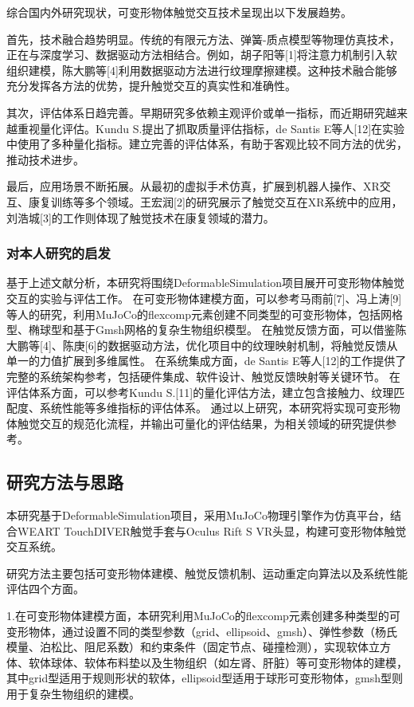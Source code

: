 综合国内外研究现状，可变形物体触觉交互技术呈现出以下发展趋势。

首先，技术融合趋势明显。传统的有限元方法、弹簧-质点模型等物理仿真技术，正在与深度学习、数据驱动方法相结合。例如，胡子阳等[1]将注意力机制引入软组织建模，陈大鹏等[4]利用数据驱动方法进行纹理摩擦建模。这种技术融合能够充分发挥各方法的优势，提升触觉交互的真实性和准确性。

其次，评估体系日趋完善。早期研究多依赖主观评价或单一指标，而近期研究越来越重视量化评估。Kundu S.提出了抓取质量评估指标，de Santis E等人[12]在实验中使用了多种量化指标。建立完善的评估体系，有助于客观比较不同方法的优劣，推动技术进步。

最后，应用场景不断拓展。从最初的虚拟手术仿真，扩展到机器人操作、XR交互、康复训练等多个领域。王宏润[2]的研究展示了触觉交互在XR系统中的应用，刘浩城[3]的工作则体现了触觉技术在康复领域的潜力。

\subsubsection{对本人研究的启发}

基于上述文献分析，本研究将围绕DeformableSimulation项目展开可变形物体触觉交互的实验与评估工作。
在可变形物体建模方面，可以参考马雨前[7]、冯上涛[9]等人的研究，利用MuJoCo的flexcomp元素创建不同类型的可变形物体，包括网格型、椭球型和基于Gmsh网格的复杂生物组织模型。
在触觉反馈方面，可以借鉴陈大鹏等[4]、陈庚[6]的数据驱动方法，优化项目中的纹理映射机制，将触觉反馈从单一的力值扩展到多维属性。
在系统集成方面，de Santis E等人[12]的工作提供了完整的系统架构参考，包括硬件集成、软件设计、触觉反馈映射等关键环节。
在评估体系方面，可以参考Kundu S.[11]的量化评估方法，建立包含接触力、纹理匹配度、系统性能等多维指标的评估体系。
通过以上研究，本研究将实现可变形物体触觉交互的规范化流程，并输出可量化的评估结果，为相关领域的研究提供参考。

\subsection{研究方法与思路}

本研究基于DeformableSimulation项目，采用MuJoCo物理引擎作为仿真平台，结合WEART TouchDIVER触觉手套与Oculus Rift S VR头显，构建可变形物体触觉交互系统。

研究方法主要包括可变形物体建模、触觉反馈机制、运动重定向算法以及系统性能评估四个方面。

1.在可变形物体建模方面，本研究利用MuJoCo的flexcomp元素创建多种类型的可变形物体，通过设置不同的类型参数（grid、ellipsoid、gmsh）、弹性参数（杨氏模量、泊松比、阻尼系数）和约束条件（固定节点、碰撞检测），实现软体立方体、软体球体、软体布料垫以及生物组织（如左肾、肝脏）等可变形物体的建模，其中grid型适用于规则形状的软体，ellipsoid型适用于球形可变形物体，gmsh型则用于复杂生物组织的建模。


